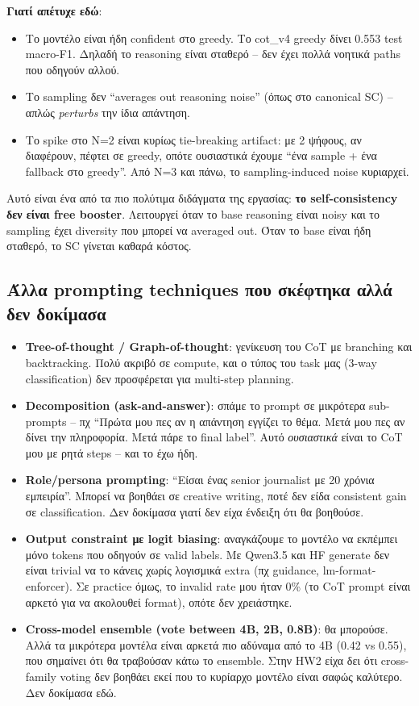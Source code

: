 \documentclass[12pt]{fphw}
\begin{document}
\textbf{Γιατί απέτυχε εδώ}:

\begin{itemize}
    \item Το μοντέλο είναι ήδη confident στο greedy. Το cot\_v4 greedy δίνει 0.553 test macro-F1. Δηλαδή το reasoning είναι σταθερό -- δεν έχει πολλά νοητικά paths που οδηγούν αλλού.
    \item Το sampling δεν ``averages out reasoning noise'' (όπως στο canonical SC) -- απλώς \emph{perturbs} την ίδια απάντηση.
    \item Το spike στο N=2 είναι κυρίως tie-breaking artifact: με 2 ψήφους, αν διαφέρουν, πέφτει σε greedy, οπότε ουσιαστικά έχουμε ``ένα sample + ένα fallback στο greedy''. Από Ν=3 και πάνω, το sampling-induced noise κυριαρχεί.
\end{itemize}

Αυτό είναι ένα από τα πιο πολύτιμα διδάγματα της εργασίας: \textbf{το self-consistency δεν είναι free booster}. Λειτουργεί όταν το base reasoning είναι noisy και το sampling έχει diversity που μπορεί να averaged out. Όταν το base είναι ήδη σταθερό, το SC γίνεται καθαρά κόστος.

\subsection{Άλλα prompting techniques που σκέφτηκα αλλά δεν δοκίμασα}

\begin{itemize}
    \item \textbf{Tree-of-thought / Graph-of-thought}: γενίκευση του CoT με branching και backtracking. Πολύ ακριβό σε compute, και ο τύπος του task μας (3-way classification) δεν προσφέρεται για multi-step planning.
    \item \textbf{Decomposition (ask-and-answer)}: σπάμε το prompt σε μικρότερα sub-prompts -- πχ ``Πρώτα μου πες αν η απάντηση εγγίζει το θέμα. Μετά μου πες αν δίνει την πληροφορία. Μετά πάρε το final label''. Αυτό \emph{ουσιαστικά} είναι το CoT μου με ρητά steps -- και το έχω ήδη.
    \item \textbf{Role/persona prompting}: ``Είσαι ένας senior journalist με 20 χρόνια εμπειρία''. Μπορεί να βοηθάει σε creative writing, ποτέ δεν είδα consistent gain σε classification. Δεν δοκίμασα γιατί δεν είχα ένδειξη ότι θα βοηθούσε.
    \item \textbf{Output constraint με logit biasing}: αναγκάζουμε το μοντέλο να εκπέμπει μόνο tokens που οδηγούν σε valid labels. Με Qwen3.5 και HF generate δεν είναι trivial να το κάνεις χωρίς λογισμικά extra (πχ guidance, lm-format-enforcer). Σε practice όμως, το invalid rate μου ήταν 0\% (το CoT prompt είναι αρκετό για να ακολουθεί format), οπότε δεν χρειάστηκε.
    \item \textbf{Cross-model ensemble (vote between 4B, 2B, 0.8B)}: θα μπορούσε. Αλλά τα μικρότερα μοντέλα είναι αρκετά πιο αδύναμα από το 4B (0.42 vs 0.55), που σημαίνει ότι θα τραβούσαν κάτω το ensemble. Στην HW2 είχα δει ότι cross-family voting δεν βοηθάει εκεί που το κυρίαρχο μοντέλο είναι σαφώς καλύτερο. Δεν δοκίμασα εδώ.
\end{itemize}
\end{document}

